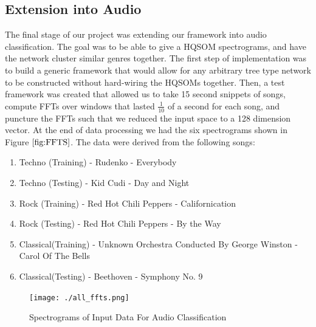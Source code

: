\documentclass[a4paper,10pt]{article}
\begin{document}
\subsection{Extension into Audio}
The final stage of our project was extending our framework into audio classification.  The goal was
to be able to give a HQSOM spectrograms, and have the network cluster similar genres together. 
The first step of implementation was to build a generic framework that would allow for any arbitrary
tree type network to be constructed without hard-wiring the HQSOMs together.  Then, a test
framework was created that allowed us to take 15 second snippets of songs, compute FFTs over windows
that lasted $\frac{1}{10}$ of a second for each song, and puncture the FFTs such that we reduced the
input space to a 128 dimension vector.  At the end of data processing we had the six spectrograms
shown in Figure $\ref{fig:FFTS}$. The data were derived from the following songs:
\begin{enumerate}
 \item Techno (Training) - Rudenko - Everybody
 \item Techno (Testing) - Kid Cudi - Day and Night
 \item Rock (Training) - Red Hot Chili Peppers - Californication
 \item Rock (Testing) - Red Hot Chili Peppers - By the Way
 \item Classical(Training) - Unknown Orchestra Conducted By George Winston - Carol Of The Bells
 \item Classical(Testing) - Beethoven - Symphony No. 9
\end{enumerate}

\begin{figure}[ht]
\begin{center}
  \texttt{[image: ./all\_ffts.png]}
\end{center}
\caption{Spectrograms of Input Data For Audio Classification}
\label{fig:FFTS}
\end{figure}
\end{document}
